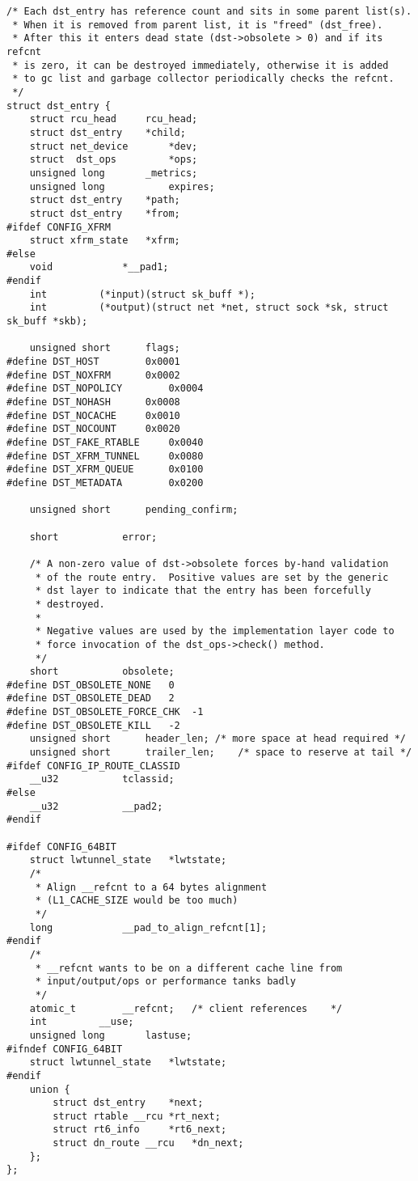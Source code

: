 \begin{verbatim}
/* Each dst_entry has reference count and sits in some parent list(s).
 * When it is removed from parent list, it is "freed" (dst_free).
 * After this it enters dead state (dst->obsolete > 0) and if its refcnt
 * is zero, it can be destroyed immediately, otherwise it is added
 * to gc list and garbage collector periodically checks the refcnt.
 */
struct dst_entry {
	struct rcu_head		rcu_head;
	struct dst_entry	*child;
	struct net_device       *dev;
	struct  dst_ops	        *ops;
	unsigned long		_metrics;
	unsigned long           expires;
	struct dst_entry	*path;
	struct dst_entry	*from;
#ifdef CONFIG_XFRM
	struct xfrm_state	*xfrm;
#else
	void			*__pad1;
#endif
	int			(*input)(struct sk_buff *);
	int			(*output)(struct net *net, struct sock *sk, struct sk_buff *skb);

	unsigned short		flags;
#define DST_HOST		0x0001
#define DST_NOXFRM		0x0002
#define DST_NOPOLICY		0x0004
#define DST_NOHASH		0x0008
#define DST_NOCACHE		0x0010
#define DST_NOCOUNT		0x0020
#define DST_FAKE_RTABLE		0x0040
#define DST_XFRM_TUNNEL		0x0080
#define DST_XFRM_QUEUE		0x0100
#define DST_METADATA		0x0200

	unsigned short		pending_confirm;

	short			error;

	/* A non-zero value of dst->obsolete forces by-hand validation
	 * of the route entry.  Positive values are set by the generic
	 * dst layer to indicate that the entry has been forcefully
	 * destroyed.
	 *
	 * Negative values are used by the implementation layer code to
	 * force invocation of the dst_ops->check() method.
	 */
	short			obsolete;
#define DST_OBSOLETE_NONE	0
#define DST_OBSOLETE_DEAD	2
#define DST_OBSOLETE_FORCE_CHK	-1
#define DST_OBSOLETE_KILL	-2
	unsigned short		header_len;	/* more space at head required */
	unsigned short		trailer_len;	/* space to reserve at tail */
#ifdef CONFIG_IP_ROUTE_CLASSID
	__u32			tclassid;
#else
	__u32			__pad2;
#endif

#ifdef CONFIG_64BIT
	struct lwtunnel_state   *lwtstate;
	/*
	 * Align __refcnt to a 64 bytes alignment
	 * (L1_CACHE_SIZE would be too much)
	 */
	long			__pad_to_align_refcnt[1];
#endif
	/*
	 * __refcnt wants to be on a different cache line from
	 * input/output/ops or performance tanks badly
	 */
	atomic_t		__refcnt;	/* client references	*/
	int			__use;
	unsigned long		lastuse;
#ifndef CONFIG_64BIT
	struct lwtunnel_state   *lwtstate;
#endif
	union {
		struct dst_entry	*next;
		struct rtable __rcu	*rt_next;
		struct rt6_info		*rt6_next;
		struct dn_route __rcu	*dn_next;
	};
};
\end{verbatim}

